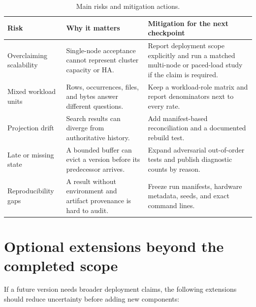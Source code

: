 \documentclass[a4paper,11pt]{article}
\begin{document}
\begin{table}[ht]
\centering
\caption{Main risks and mitigation actions.}
\label{tab:risks}
\begin{tabularx}{\textwidth}{@{}p{}p{}X@{}}
\toprule
Risk & Why it matters & Mitigation for the next checkpoint \\
\midrule
Overclaiming scalability & Single-node acceptance cannot represent cluster capacity or HA. & Report deployment scope explicitly and run a matched multi-node or paced-load study if the claim is required. \\
Mixed workload units & Rows, occurrences, files, and bytes answer different questions. & Keep a workload-role matrix and report denominators next to every rate. \\
Projection drift & Search results can diverge from authoritative history. & Add manifest-based reconciliation and a documented rebuild test. \\
Late or missing state & A bounded buffer can evict a version before its predecessor arrives. & Expand adversarial out-of-order tests and publish diagnostic counts by reason. \\
Reproducibility gaps & A result without environment and artifact provenance is hard to audit. & Freeze run manifests, hardware metadata, seeds, and exact command lines. \\
\bottomrule
\end{tabularx}
\end{table}

\section{Optional extensions beyond the completed scope}

If a future version needs broader deployment claims, the following extensions should reduce uncertainty before adding new components:
\end{document}
